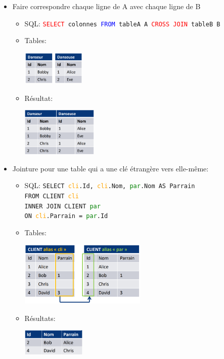 \documentclass[a4paper]{article}
\begin{document}
\begin{itemize}
\item Faire correspondre chaque ligne de A avec chaque ligne de B
\begin{itemize}
    \item SQL: \texttt{\textcolor{red}{SELECT} colonnes \textcolor{blue}{FROM} tableA A \textcolor{red}{CROSS JOIN} tableB B}
    \item Tables:
    \begin{center}
        \includegraphics[width=0.25\textwidth]{../images/cross-join-01.PNG}
    \end{center}
    \item Résultat:
    \begin{center}
        \includegraphics[width=0.30\textwidth]{../images/cross-join-02.PNG}
    \end{center}
\end{itemize}



\item Jointure pour une table qui a une clé étrangère vers elle-même:
\begin{itemize}
    \item SQL: \texttt{SELECT \textcolor{orange}{cli}.Id, \textcolor{orange}{cli}.Nom, \textcolor{green}{par}.Nom AS Parrain} \\
    \texttt{FROM CLIENT \textcolor{orange}{cli}} \\
    \texttt{INNER JOIN CLIENT \textcolor{green}{par}} \\
    \texttt{ON \textcolor{orange}{cli}.Parrain = \textcolor{green}{par}.Id}
    \item Tables:
    \begin{center}
        \includegraphics[width=0.5\textwidth]{../images/self-join-01.PNG}
    \end{center}
    \item Résultats:
    \begin{center}
        \includegraphics[width=0.25\textwidth]{../images/self-join-02.PNG}
    \end{center}
\end{itemize}



\end{itemize}
\end{document}
